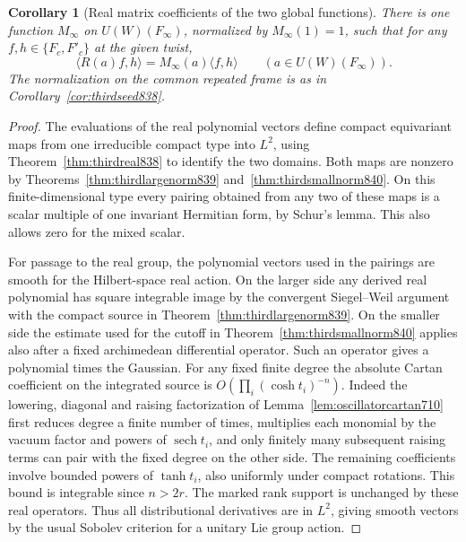 \documentclass[a4paper,11pt]{article}
\newtheorem{corollary}[proposition]{Corollary}
\theoremstyle{definition}
\theoremstyle{remark}
\numberwithin{equation}{section}
\begin{document}
\begin{corollary}[Real matrix coefficients of the two global functions]
\leavevmode\label{cor:thirdrealmatrix841}
There is one function \(M_\infty\) on \(U(W)(F_\infty)\),
normalized by \(M_\infty(1)=1\), such that for any
\(f,h\in\{F_c,F'_c\}\) at the given twist,
\[
                 \langle R(a)f,h\rangle
                        =M_\infty(a)\langle f,h\rangle
                   \qquad (a\in U(W)(F_\infty)).
\]
The normalization on the common repeated frame is as in
Corollary~\ref{cor:thirdseed838}.
\end{corollary}
\begin{proof}
The evaluations of the real polynomial vectors define compact
equivariant maps from one irreducible compact type into
\(L^2\), using Theorem~\ref{thm:thirdreal838} to identify the
two domains. Both maps are nonzero by
Theorems~\ref{thm:thirdlargenorm839} and~\ref{thm:thirdsmallnorm840}.
On this finite-dimensional type every pairing obtained from
any two of these maps is a scalar multiple of one invariant
Hermitian form, by Schur's lemma. This also allows zero for
the mixed scalar.

For passage to the real group, the polynomial vectors used
in the pairings are smooth for the Hilbert-space real action.
On the larger side any derived real polynomial has square
integrable image by the convergent Siegel--Weil argument
with the compact source in Theorem~\ref{thm:thirdlargenorm839}.
On the smaller side the estimate used for the cutoff in
Theorem~\ref{thm:thirdsmallnorm840} applies also after a
fixed archimedean differential operator. Such an operator
gives a polynomial times the Gaussian. For any fixed finite
degree the absolute Cartan coefficient on the integrated
source is \(O(\prod_i(\cosh t_i)^{-n})\). Indeed the lowering,
diagonal and raising factorization of
Lemma~\ref{lem:oscillatorcartan710} first reduces degree a
finite number of times, multiplies each monomial by the
vacuum factor and powers of \(\operatorname{sech} t_i\),
and only finitely many subsequent raising terms can pair
with the fixed degree on the other side. The remaining
coefficients involve bounded powers of \(\tanh t_i\), also
uniformly under compact rotations. This bound is integrable
since \(n>2r\). The marked rank support is unchanged by
these real operators. Thus all distributional derivatives
are in \(L^2\), giving smooth vectors by the usual Sobolev
criterion for a unitary Lie group action.


\end{proof}
\end{document}

